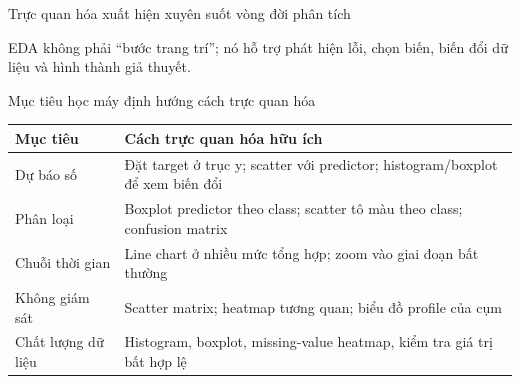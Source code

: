 \documentclass[aspectratio=169,12pt]{beamer}
\newcommand{\muted}[1]{\textcolor{Muted}{#1}}
\begin{document}
\begin{frame}{Trực quan hóa xuất hiện xuyên suốt vòng đời phân tích}
\centering
{}
\vspace{5mm}

\muted{EDA không phải “bước trang trí”; nó hỗ trợ phát hiện lỗi, chọn biến, biến đổi dữ liệu và hình thành giả thuyết.}
\end{frame}

\begin{frame}{Mục tiêu học máy định hướng cách trực quan hóa}
\small
\begin{tabularx}{\textwidth}{@{}p{3.1cm}X@{}}
\toprule
\textbf{Mục tiêu} & \textbf{Cách trực quan hóa hữu ích} \\
\midrule
Dự báo số & Đặt target ở trục y; scatter với predictor; histogram/boxplot để xem biến đổi \\
Phân loại & Boxplot predictor theo class; scatter tô màu theo class; confusion matrix \\
Chuỗi thời gian & Line chart ở nhiều mức tổng hợp; zoom vào giai đoạn bất thường \\
Không giám sát & Scatter matrix; heatmap tương quan; biểu đồ profile của cụm \\
Chất lượng dữ liệu & Histogram, boxplot, missing-value heatmap, kiểm tra giá trị bất hợp lệ \\
\bottomrule
\end{tabularx}
\end{frame}
\end{document}
